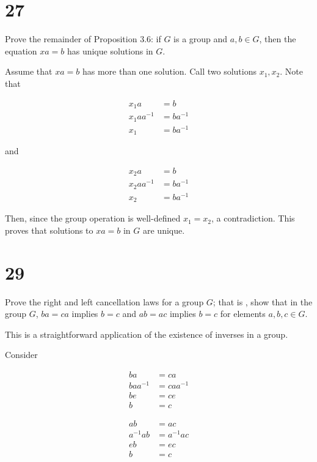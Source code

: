\documentclass[a4paper]{article}
\begin{document}
\section*{27}

Prove the remainder of Proposition 3.6: if $G$ is a group and $a,b \in G$, then the equation $xa = b$ has unique solutions in $G$.

\vspace{\baselineskip}

Assume that $xa = b$ has more than one solution. Call two solutions $x_1, x_2$. Note that 

\begin{align*}
x_1 a &= b \\
x_1 a a^{-1} &= b a^{-1} \\
x_1 &= b a^{-1}
\end{align*}

and 

\begin{align*}
x_2 a &= b \\
x_2 a a^{-1} &= b a^{-1} \\
x_2 &= b a^{-1}
\end{align*}

Then, since the group operation is well-defined $x_1 = x_2$, a contradiction. This proves that solutions to $xa = b$ in $G$ are unique.




\section*{29}

Prove the right and left cancellation laws for a group $G$; that is , show that in the group $G$, $ba = ca$ implies $b = c$ and $ab = ac$ implies $b = c$ for elements $a,b,c \in G$.

\vspace{\baselineskip}

This is a straightforward application of the existence of inverses in a  group.

Consider

\begin{align*}
ba &= ca \\
baa^{-1} &= caa^{-1} \\
be &= ce \\ 
b &= c
\end{align*}

\begin{align*}
ab &= ac \\
a^{-1}ab &= a^{-1}ac \\
eb &= ec \\
b &= c
\end{align*}
\end{document}
